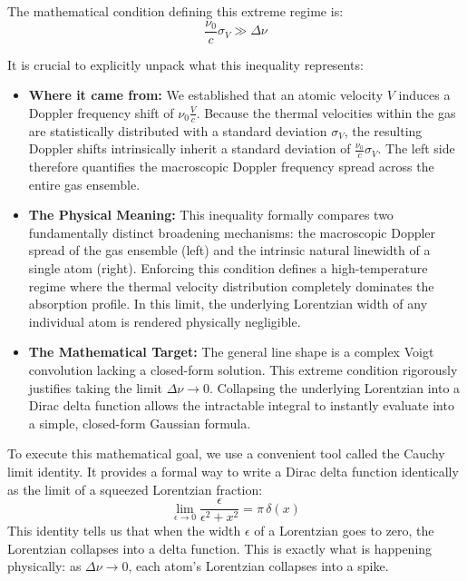 The mathematical condition defining this extreme regime is:
\begin{equation*}
    \frac{\nu_0}{c}\sigma_V \gg \Delta\nu
\end{equation*}

It is crucial to explicitly unpack what this inequality represents:
\begin{itemize}
    \item \textbf{Where it came from:} We established that an atomic velocity $V$ induces a Doppler frequency shift of $\nu_0 \frac{V}{c}$. Because the thermal velocities within the gas are statistically distributed with a standard deviation $\sigma_V$, the resulting Doppler shifts intrinsically inherit a standard deviation of $\frac{\nu_0}{c}\sigma_V$. The left side therefore quantifies the macroscopic Doppler frequency spread across the entire gas ensemble.
    \item \textbf{The Physical Meaning:} This inequality formally compares two fundamentally distinct broadening mechanisms: the macroscopic Doppler spread of the gas ensemble (left) and the intrinsic natural linewidth of a single atom (right). Enforcing this condition defines a high-temperature regime where the thermal velocity distribution completely dominates the absorption profile. In this limit, the underlying Lorentzian width of any individual atom is rendered physically negligible.
    \item \textbf{The Mathematical Target:} The general line shape is a complex Voigt convolution lacking a closed-form solution. This extreme condition rigorously justifies taking the limit $\Delta\nu \to 0$. Collapsing the underlying Lorentzian into a Dirac delta function allows the intractable integral to instantly evaluate into a simple, closed-form Gaussian formula.
\end{itemize}

To execute this mathematical goal, we use a convenient tool called the Cauchy limit identity. It provides a formal way to write a Dirac delta function identically as the limit of a squeezed Lorentzian fraction:
\begin{equation*}
    \lim_{\epsilon \to 0} \frac{\epsilon}{\epsilon^2 + x^2} = \pi\,\delta(x)
\end{equation*}
This identity tells us that when the width $\epsilon$ of a Lorentzian goes to zero, the Lorentzian collapses into a delta function. This is exactly what is happening physically: as $\Delta\nu \to 0$, each atom's Lorentzian collapses into a spike.

